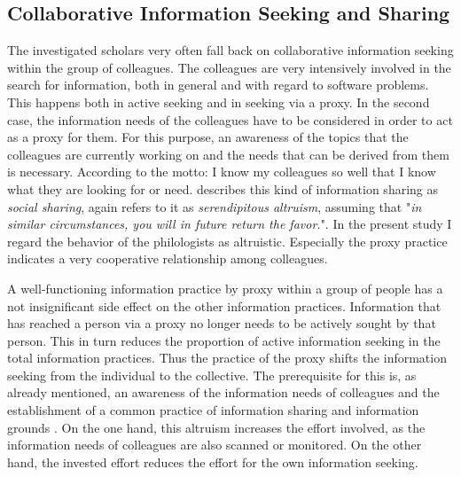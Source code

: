 \documentclass[12pt, a4paper, titlepage, oneside, abstract=true, toc=listof, toc=bibliography, BCOR=1cm]{scrreprt}
\begin{document}
{\subsection*{Collaborative Information Seeking and Sharing}
The investigated scholars very often fall back on collaborative information seeking \citep{Shah2010, Talja2006} within the group of colleagues. The colleagues are very intensively involved in the search for information, both in general and with regard to software problems. This happens both in active seeking and in seeking via a proxy. In the second case, the information needs of the colleagues have to be considered in order to act as a proxy for them. For this purpose, an awareness \citep{Dourish1992} of the topics that the colleagues are currently working on and the needs that can be derived from them is necessary. According to the motto: I know my colleagues so well that I know what they are looking for or need. \citet[p. 149]{Talja2002} describes this kind of information sharing as \textit{social sharing}, \citet[p. 774]{Twidale1997} again refers to it as \textit{serendipitous altruism}, assuming that "\textit{in similar circumstances, you will in future return the favor.}". In the present study I regard the behavior of the philologists as altruistic. Especially the proxy practice indicates a very cooperative relationship among colleagues. 

A well-functioning information practice by proxy within a group of people has a not insignificant side effect on the other information practices. Information that has reached a person via a proxy no longer needs to be actively sought by that person. This in turn reduces the proportion of active information seeking in the total information practices. Thus the practice of the proxy shifts the information seeking from the individual to the collective. The prerequisite for this is, as already mentioned, an awareness of the information needs of colleagues and the establishment of a common practice of information sharing and information grounds \citep{Hertzum2008}. On the one hand, this altruism increases the effort involved, as the information needs of colleagues are also scanned or monitored. On the other hand, the invested effort reduces the effort for the own information seeking. 

}
\end{document}

